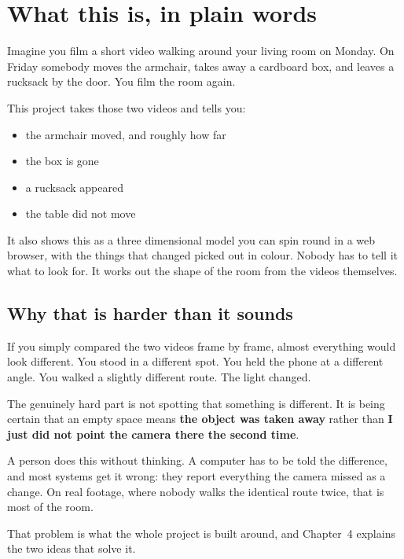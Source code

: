 \chapter{What this is, in plain words}

Imagine you film a short video walking around your living room on Monday. On Friday somebody moves
the armchair, takes away a cardboard box, and leaves a rucksack by the door. You film the room
again.

This project takes those two videos and tells you:

\begin{itemize}
  \item the armchair moved, and roughly how far
  \item the box is gone
  \item a rucksack appeared
  \item the table did not move
\end{itemize}

It also shows this as a three dimensional model you can spin round in a web browser, with the
things that changed picked out in colour. Nobody has to tell it what to look for. It works out the
shape of the room from the videos themselves.

\section{Why that is harder than it sounds}

If you simply compared the two videos frame by frame, almost everything would look different. You
stood in a different spot. You held the phone at a different angle. You walked a slightly different
route. The light changed.

The genuinely hard part is not spotting that something is different. It is being certain that an
empty space means \textbf{the object was taken away} rather than \textbf{I just did not point the
camera there the second time}.

\begin{watch}
A person does this without thinking. A computer has to be told the difference, and most systems get
it wrong: they report everything the camera missed as a change. On real footage, where nobody walks
the identical route twice, that is most of the room.
\end{watch}

That problem is what the whole project is built around, and Chapter~4 explains the two ideas that
solve it.

